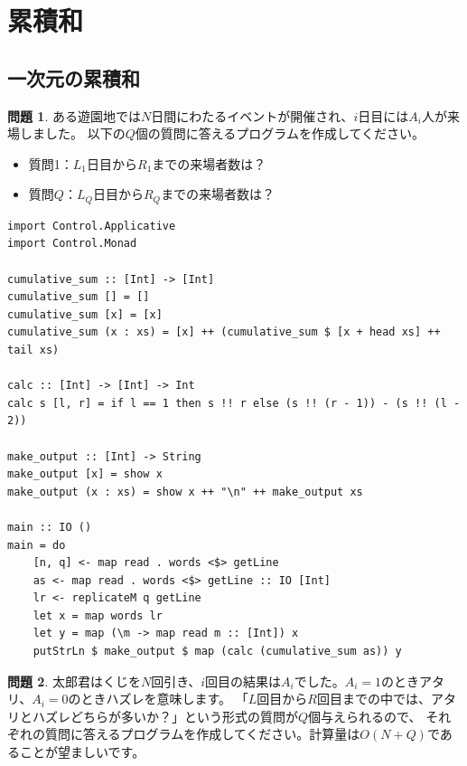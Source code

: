 \documentclass[12pt,a4paper,dvipdfmx,fleqn]{article}%
\theoremstyle{definition}
\newtheorem*{toi*}{問題}
\theoremstyle{definition}
\theoremstyle{definition}
\begin{document}
\section{累積和}\label{累積和}
\subsection{一次元の累積和}\label{一次元の累積和}
\begin{toi*}
    ある遊園地では$N$日間にわたるイベントが開催され、$i$日目には$A_i$人が来場しました。
    以下の$Q$個の質問に答えるプログラムを作成してください。
    \begin{itemize}
        \item [] 質問1：$L_1$日目から$R_1$までの来場者数は？\\[2mm]
        \hspace{2em}{\vdots}
        \item [] 質問$Q$：$L_Q$日目から$R_Q$までの来場者数は？
    \end{itemize}
\end{toi*}
\begin{lstlisting}[caption=A06.hs,label=A06]
import Control.Applicative
import Control.Monad

cumulative_sum :: [Int] -> [Int]
cumulative_sum [] = []
cumulative_sum [x] = [x]
cumulative_sum (x : xs) = [x] ++ (cumulative_sum $ [x + head xs] ++ tail xs)

calc :: [Int] -> [Int] -> Int
calc s [l, r] = if l == 1 then s !! r else (s !! (r - 1)) - (s !! (l - 2))

make_output :: [Int] -> String
make_output [x] = show x
make_output (x : xs) = show x ++ "\n" ++ make_output xs

main :: IO ()
main = do
    [n, q] <- map read . words <$> getLine
    as <- map read . words <$> getLine :: IO [Int]
    lr <- replicateM q getLine
    let x = map words lr
    let y = map (\m -> map read m :: [Int]) x
    putStrLn $ make_output $ map (calc (cumulative_sum as)) y
\end{lstlisting}
\begin{toi*}
    太郎君はくじを$N$回引き、$i$回目の結果は$A_i$でした。$A_i=1$のときアタリ、$A_i=0$のときハズレを意味します。
    「$L$回目から$R$回目までの中では、アタリとハズレどちらが多いか？」という形式の質問が$Q$個与えられるので、
    それぞれの質問に答えるプログラムを作成してください。計算量は$O(N+Q)$であることが望ましいです。
\end{toi*}
\end{document}
